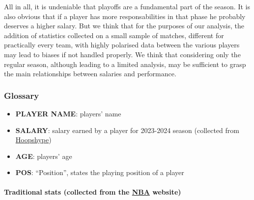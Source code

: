 \documentclass[
]{article}
\providecommand{\tightlist}{%
  \setlength{\itemsep}{0pt}\setlength{\parskip}{0pt}}
\begin{document}
All in all, it is undeniable that playoffs are a fundamental part of the
season. It is also obvious that if a player has more responsabilities in
that phase he probably deserves a higher salary. But we think that for
the purposes of our analysis, the addition of statistics collected on a
small sample of matches, different for practically every team, with
highly polarised data between the various players may lead to biases if
not handled properly. We think that considering only the regular season,
although leading to a limited analysis, may be sufficient to grasp the
main relationships between salaries and performance.

\hypertarget{glossary}{%
\subsubsection{Glossary}\label{glossary}}

\begin{itemize}
\tightlist
\item
  \textbf{PLAYER NAME}: players' name
\item
  \textbf{SALARY}: salary earned by a player for 2023-2024 season
  (collected from \href{https://hoopshype.com/}{Hoopshype})
\item
  \textbf{AGE}: players' age
\item
  \textbf{POS}: ``Position'', states the playing position of a player
\end{itemize}

\hypertarget{traditional-stats-collected-from-the-nba-website}{%
\paragraph{\texorpdfstring{Traditional stats (collected from the
\href{https://www.nba.com/?47}{NBA}
website)}{Traditional stats (collected from the NBA website)}}\label{traditional-stats-collected-from-the-nba-website}}
\end{document}
